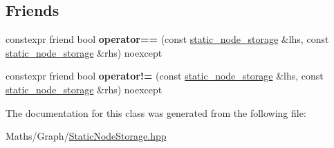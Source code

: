 \subsection*{Friends}
\begin{DoxyCompactItemize}
\item 
\mbox{\label{classsequoia_1_1maths_1_1graph__impl_1_1static__node__storage_3_01_weight_proxy_00_01_n_00_01true_01_4_a890f2413764441d3c53a7f02e6ea45f2}} 
constexpr friend bool {\bfseries operator==} (const \mbox{\hyperlink{classsequoia_1_1maths_1_1graph__impl_1_1static__node__storage}{static\+\_\+node\+\_\+storage}} \&lhs, const \mbox{\hyperlink{classsequoia_1_1maths_1_1graph__impl_1_1static__node__storage}{static\+\_\+node\+\_\+storage}} \&rhs) noexcept
\item 
\mbox{\label{classsequoia_1_1maths_1_1graph__impl_1_1static__node__storage_3_01_weight_proxy_00_01_n_00_01true_01_4_ae1f66986358c1c302ff2e00445619efb}} 
constexpr friend bool {\bfseries operator!=} (const \mbox{\hyperlink{classsequoia_1_1maths_1_1graph__impl_1_1static__node__storage}{static\+\_\+node\+\_\+storage}} \&lhs, const \mbox{\hyperlink{classsequoia_1_1maths_1_1graph__impl_1_1static__node__storage}{static\+\_\+node\+\_\+storage}} \&rhs) noexcept
\end{DoxyCompactItemize}


The documentation for this class was generated from the following file\+:\begin{DoxyCompactItemize}
\item 
Maths/\+Graph/\mbox{\hyperlink{_static_node_storage_8hpp}{Static\+Node\+Storage.\+hpp}}\end{DoxyCompactItemize}
